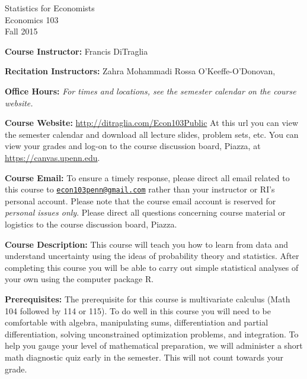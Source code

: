 \documentclass[11pt, letterpaper]{article}
\begin{document}
\thispagestyle{plain}

\begin{center}
\Large
\sc
Statistics for Economists\\
\large
Economics 103\\
\large
Fall 2015
\end{center}


\normalsize
\bigskip
\noindent \textbf{Course Instructor:} Francis DiTraglia 

\medskip


\noindent \textbf{Recitation Instructors:}
  Zahra Mohammadi
  Rossa O'Keeffe-O'Donovan,
\medskip


\noindent \textbf{Office Hours:} \emph{For times and locations, see the semester calendar on the course website.}


\medskip
 
\noindent \textbf{Course Website:} \url{http://ditraglia.com/Econ103Public} At this url you can view the semester calendar and download all lecture slides, problem sets, etc.
You can view your grades and log-on to the course discussion board, Piazza, at \url{https://canvas.upenn.edu}.

\medskip

\noindent \textbf{Course Email:} To ensure a timely response, please direct all email related to this course to \href{mailto:econ103penn@gmail.com}{\texttt{econ103penn@gmail.com}} rather than your instructor or RI's personal account.
Please note that the course email account is reserved for \emph{personal issues only}. 
Please direct all questions concerning course material or logistics to the course discussion board, Piazza.

\medskip



\noindent \textbf{Course Description:} 
This course will teach you how to learn from data and understand uncertainty using the ideas of probability theory and statistics. 
After completing this course you will be able to carry out simple statistical analyses of your own using the computer package R.


\medskip

\noindent \textbf{Prerequisites:} 
The prerequisite for this course is multivariate calculus (Math 104 followed by 114 or 115). 
To do well in this course you will need to be comfortable with algebra, manipulating sums, differentiation and partial differentiation, solving unconstrained optimization problems, and integration. 
To help you gauge your level of mathematical preparation, we will administer a short math diagnostic quiz early in the semester.
This will not count towards your grade.
\end{document}
